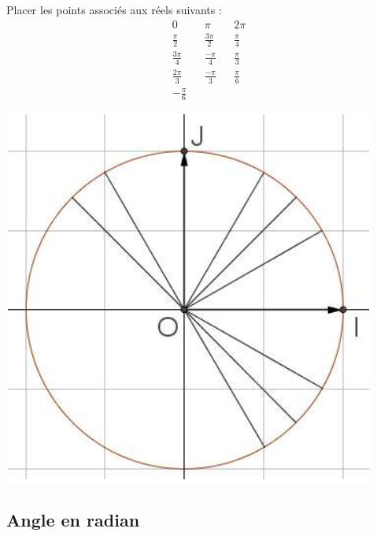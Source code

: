 \documentclass[11pt]{article}
\begin{document}
\begin{app}
  \begin{minipage}{.5\textwidth}
   Placer les points associés aux réels suivants : 
   \begin{align*}
     & 0 &
     & \pi &
     & 2\pi \\
     & \frac{\pi}{2} &
     & \frac{3\pi}{2} &
     & \frac{\pi}{4} \\
     & \frac{3\pi}{4} &
     & \frac{-\pi}{4} &
     & \frac{\pi}{3} \\
     & \frac{2\pi}{3} &
     & \frac{-\pi}{3} &
     & \frac{\pi}{6} \\
     &-\frac{\pi}{6}&
     & & &
   \end{align*}
  \end{minipage}
  \begin{minipage}{.5\textwidth}
    \begin{center}
      \includegraphics[scale=.3]{images.png}
    \end{center}
  \end{minipage}
\end{app}

\subsection{Angle en radian}

\end{document}
